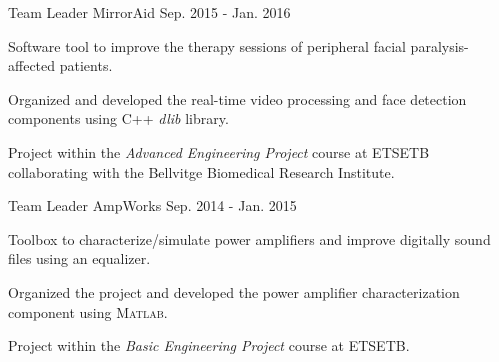 
\begin{cventries}

  \cventry
    {Team Leader} %
    {MirrorAid} %
    {} %
    {Sep. 2015 - Jan. 2016} %
    {
      \begin{cvitems} %
        \item {Software tool to improve the therapy sessions of peripheral facial paralysis-affected patients.}
        \item {Organized and developed the real-time video processing and face detection components using C++ \textit{dlib} library.}
        \item {Project within the \textit{Advanced Engineering Project} course at ETSETB collaborating with the Bellvitge Biomedical Research Institute.}
      \end{cvitems}
    }

  \cventry
    {Team Leader} %
    {AmpWorks} %
    {} %
    {Sep. 2014 - Jan. 2015} %
    {
      \begin{cvitems} %
        \item {Toolbox to characterize/simulate power amplifiers and improve digitally sound files using an equalizer.}
        \item {Organized the project and developed the power amplifier characterization component using \textsc{Matlab}.}
        \item {Project within the \textit{Basic Engineering Project} course at ETSETB.}
      \end{cvitems}
    }

\end{cventries}
